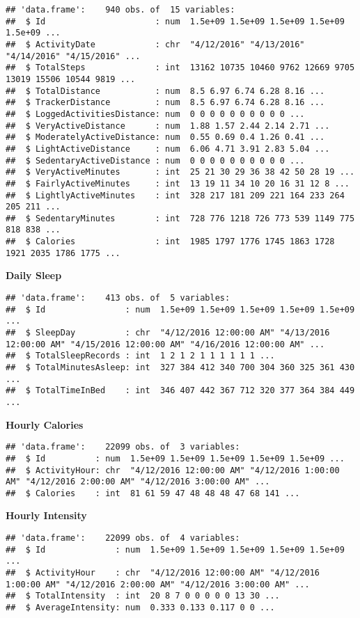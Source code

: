 \documentclass[
]{article}
\begin{document}
\begin{verbatim}
## 'data.frame':    940 obs. of  15 variables:
##  $ Id                      : num  1.5e+09 1.5e+09 1.5e+09 1.5e+09 1.5e+09 ...
##  $ ActivityDate            : chr  "4/12/2016" "4/13/2016" "4/14/2016" "4/15/2016" ...
##  $ TotalSteps              : int  13162 10735 10460 9762 12669 9705 13019 15506 10544 9819 ...
##  $ TotalDistance           : num  8.5 6.97 6.74 6.28 8.16 ...
##  $ TrackerDistance         : num  8.5 6.97 6.74 6.28 8.16 ...
##  $ LoggedActivitiesDistance: num  0 0 0 0 0 0 0 0 0 0 ...
##  $ VeryActiveDistance      : num  1.88 1.57 2.44 2.14 2.71 ...
##  $ ModeratelyActiveDistance: num  0.55 0.69 0.4 1.26 0.41 ...
##  $ LightActiveDistance     : num  6.06 4.71 3.91 2.83 5.04 ...
##  $ SedentaryActiveDistance : num  0 0 0 0 0 0 0 0 0 0 ...
##  $ VeryActiveMinutes       : int  25 21 30 29 36 38 42 50 28 19 ...
##  $ FairlyActiveMinutes     : int  13 19 11 34 10 20 16 31 12 8 ...
##  $ LightlyActiveMinutes    : int  328 217 181 209 221 164 233 264 205 211 ...
##  $ SedentaryMinutes        : int  728 776 1218 726 773 539 1149 775 818 838 ...
##  $ Calories                : int  1985 1797 1776 1745 1863 1728 1921 2035 1786 1775 ...
\end{verbatim}

\textbf{Daily Sleep}

\begin{verbatim}
## 'data.frame':    413 obs. of  5 variables:
##  $ Id                : num  1.5e+09 1.5e+09 1.5e+09 1.5e+09 1.5e+09 ...
##  $ SleepDay          : chr  "4/12/2016 12:00:00 AM" "4/13/2016 12:00:00 AM" "4/15/2016 12:00:00 AM" "4/16/2016 12:00:00 AM" ...
##  $ TotalSleepRecords : int  1 2 1 2 1 1 1 1 1 1 ...
##  $ TotalMinutesAsleep: int  327 384 412 340 700 304 360 325 361 430 ...
##  $ TotalTimeInBed    : int  346 407 442 367 712 320 377 364 384 449 ...
\end{verbatim}

\textbf{Hourly Calories}

\begin{verbatim}
## 'data.frame':    22099 obs. of  3 variables:
##  $ Id          : num  1.5e+09 1.5e+09 1.5e+09 1.5e+09 1.5e+09 ...
##  $ ActivityHour: chr  "4/12/2016 12:00:00 AM" "4/12/2016 1:00:00 AM" "4/12/2016 2:00:00 AM" "4/12/2016 3:00:00 AM" ...
##  $ Calories    : int  81 61 59 47 48 48 48 47 68 141 ...
\end{verbatim}

\textbf{Hourly Intensity}

\begin{verbatim}
## 'data.frame':    22099 obs. of  4 variables:
##  $ Id              : num  1.5e+09 1.5e+09 1.5e+09 1.5e+09 1.5e+09 ...
##  $ ActivityHour    : chr  "4/12/2016 12:00:00 AM" "4/12/2016 1:00:00 AM" "4/12/2016 2:00:00 AM" "4/12/2016 3:00:00 AM" ...
##  $ TotalIntensity  : int  20 8 7 0 0 0 0 0 13 30 ...
##  $ AverageIntensity: num  0.333 0.133 0.117 0 0 ...
\end{verbatim}
\end{document}
